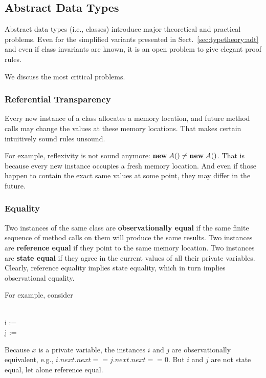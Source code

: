 \subsection{Abstract Data Types}

Abstract data types (i.e., classes) introduce major theoretical and practical problems.
Even for the simplified variants presented in Sect.~\ref{sec:typetheory:adt} and even if class invariants are known, it is an open problem to give elegant proof rules.

We discuss the most critical problems.

\subsubsection{Referential Transparency}

Every new instance of a class allocates a memory location, and future method calls may change the values at these memory locations.
That makes certain intuitively sound rules unsound.

For example, reflexivity is not sound anymore: ${\rm \bf new}\; A()\neq {\rm \bf new}\; A()$.
That is because every new instance occupies a fresh memory location.
And even if those happen to contain the exact same values at some point, they may differ in the future.

\subsubsection{Equality}

Two instances of the same class are \textbf{observationally equal} if the same finite sequence of method calls on them will produce the same results.
Two instances are \textbf{reference equal} if they point to the same memory location.
Two instances are \textbf{state equal} if they agree in the current values of all their private variables.
Clearly, reference equality implies state equality, which in turn implies observational equality.

For example, consider
\begin{acode}
\\
i := \\
j := 
\end{acode}
Because $x$ is a private variable, the instances $i$ and $j$ are observationally equivalent, e.g., $i.next.next == j.next.next == 0$.
But $i$ and $j$ are not state equal, let alone reference equal.

